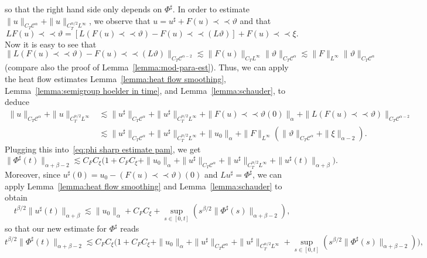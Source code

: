 \documentclass[11pt,a4paper]{article}
\newcommand{\mathd}{\mathrm{d}}
\newcommand{\precprec}{\prec\!\!\!\prec}
\theoremstyle{remark}
\newcommand{\CC}{\ensuremath{\mathscr{C}}}
\begin{document}
so that the right hand side only depends on $\Phi^{\sharp}$. In order to
estimate $\| u \|_{C_{T} \CC^\alpha} + \|u\|_{C^{\alpha/2}_TL^\infty}$,
we observe that $u = u^\sharp + F(u) \precprec \vartheta$ and that 
\[
  L F(u) \precprec \vartheta = [L(F(u)\precprec \vartheta) - F(u) \precprec (L\vartheta)] + F(u) \precprec \xi.
\]
Now it is easy to see that
\[
   \|L(F(u)\precprec \vartheta) - F(u) \precprec (L\vartheta)\|_{C_T \CC^{\alpha-2}} \lesssim \|F(u)\|_{C_TL^\infty} \|\vartheta\|_{C_T\CC^\alpha} \lesssim \|F\|_{L^\infty} \|\vartheta\|_{C_T\CC^\alpha}
\]
(compare also the proof of Lemma~\ref{lemma:mod-para-est}). Thus, we can apply the heat flow estimates Lemma~\ref{lemma:heat flow smoothing}, Lemma~\ref{lemma:semigroup hoelder in time}, and Lemma~\ref{lemma:schauder}, to deduce
\begin{align*}
   \| u \|_{C_{T} \CC^\alpha} + \|u\|_{C^{\alpha/2}_TL^\infty} & \lesssim \| u^\sharp \|_{C_{T} \CC^\alpha} + \|u^\sharp \|_{C^{\alpha/2}_TL^\infty} + \|F(u) \precprec \vartheta(0)\|_\alpha + \| L (F(u) \precprec \vartheta) \|_{C_T\CC^{\alpha-2}} \\
   & \lesssim \| u^\sharp \|_{C_{T} \CC^\alpha} + \|u^\sharp \|_{C^{\alpha/2}_TL^\infty} + \|u_0\|_\alpha + \|F\|_{L^\infty} (\|\vartheta\|_{C_T\CC^\alpha} + \|\xi\|_{\alpha-2}).
\end{align*}
Plugging this into~\eqref{eq:phi sharp estimate pam}, we get
\[
   \| \Phi^{\sharp} ( t ) \|_{\alpha + \beta - 2} \lesssim C_F C_\xi \big( 1 + C_F C_\xi + \|u_0\|_\alpha + \| u^\sharp \|_{C_{T} \CC^\alpha} + \|u^\sharp \|_{C^{\alpha/2}_TL^\infty} + \|u^\sharp (t)\|_{\alpha+\beta} \big).
\]
Moreover, since $u^{\sharp} ( 0 ) =u_{0} - ( F ( u ) \precprec \vartheta ) ( 0)$ and $L u^{\sharp} = \Phi^{\sharp}$, we can apply Lemma~\ref{lemma:heat flow smoothing} and Lemma~\ref{lemma:schauder} to obtain
\[
   t^{\beta /2} \| u^{\sharp} ( t ) \|_{\alpha+\beta} \lesssim \| u_{0} \|_{\alpha} + C_{F} C_{\xi} + \sup_{s \in [ 0,t ]} (s^{\beta /2} \| \Phi^{\sharp} ( s ) \|_{\alpha + \beta - 2} ),
\]
so that our new estimate for $\Phi^{\sharp}$ reads
\[
   t^{\beta /2} \| \Phi^{\sharp} ( t ) \|_{\alpha+\beta -2} \lesssim C_F C_\xi \big( 1 + C_F C_\xi + \|u_0\|_\alpha + \| u^\sharp \|_{C_{T} \CC^\alpha} + \|u^\sharp \|_{C^{\alpha/2}_TL^\infty} + \sup_{s \in [ 0,t ]} (s^{\beta /2} \| \Phi^{\sharp} ( s ) \|_{\alpha + \beta - 2}) \big),
\]
\end{document}
